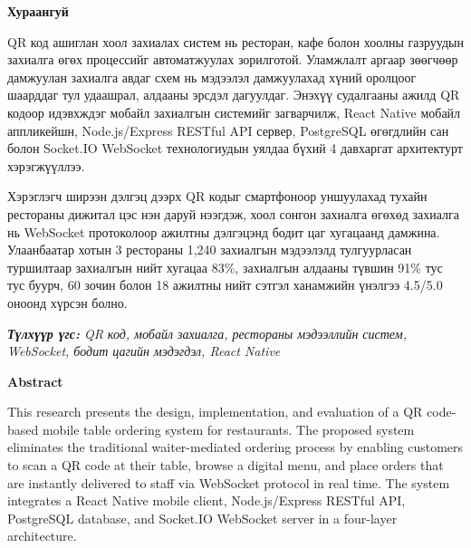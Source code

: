 
\begin{center}
{\scshape\Large \univname\par}
{\scshape\large \facname\par}\vspace{0.5cm}
{\huge\textbf{Хураангуй} \par}
\bigskip
{\Large{\ttitle} \par}
\bigskip
{\normalsize \shortname \par}
\mailaddress
\end{center}

\bigskip

QR код ашиглан хоол захиалах систем нь ресторан, кафе болон хоолны газруудын захиалга
өгөх процессийг автоматжуулах зорилготой. Уламжлалт аргаар зөөгчөөр дамжуулан захиалга
авдаг схем нь мэдээлэл дамжуулахад хүний оролцоог шаарддаг тул удаашрал, алдааны
эрсдэл дагуулдаг. Энэхүү судалгааны ажилд QR кодоор идэвхждэг мобайл захиалгын системийг
загварчилж, React Native мобайл аппликейшн, Node.js/Express RESTful API сервер, PostgreSQL
өгөгдлийн сан болон Socket.IO WebSocket технологиудын уялдаа бүхий 4 давхаргат архитектурт
хэрэгжүүллээ.

Хэрэглэгч ширээн дэлгэц дээрх QR кодыг смартфоноор уншуулахад тухайн рестораны
дижитал цэс нэн даруй нээгдэж, хоол сонгон захиалга өгөхөд захиалга нь WebSocket
протоколоор ажилтны дэлгэцэнд бодит цаг хугацаанд дамжина. Улаанбаатар хотын 3 рестораны
1,240 захиалгын мэдээлэлд тулгуурласан туршилтаар захиалгын нийт хугацаа 83\%,
захиалгын алдааны түвшин 91\% тус тус буурч, 60 зочин болон 18 ажилтны нийт сэтгэл
ханамжийн үнэлгээ 4.5/5.0 оноонд хүрсэн болно.

\bigskip
\noindent\textit{\textbf{Түлхүүр үгс:} QR код, мобайл захиалга, рестораны мэдээллийн систем, WebSocket, бодит цагийн мэдэгдэл, React Native}

\bigskip

\begin{center}
{\huge\textbf{Abstract} \par}
\bigskip
{\Large{\ttitleng} \par}
\bigskip
{\normalsize \shortname \par}
\end{center}

\bigskip

This research presents the design, implementation, and evaluation of a QR code-based mobile
table ordering system for restaurants. The proposed system eliminates the traditional waiter-mediated 
ordering process by enabling customers to scan a QR code at their table, browse a digital menu, 
and place orders that are instantly delivered to staff via WebSocket protocol in real time. The system 
integrates a React Native mobile client, Node.js/Express RESTful API, PostgreSQL database, and 
Socket.IO WebSocket server in a four-layer architecture.

